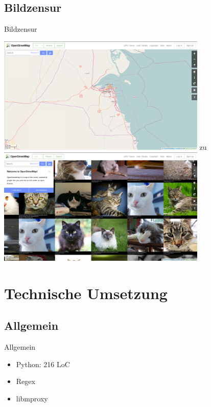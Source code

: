 \documentclass [xcolor=dvipsnames] {beamer}
\begin{document}
\subsection{Bildzensur}
\begin{frame}
	{\sc Bildzensur}
	\begin{center}
		{
			\includegraphics[width=10cm]{osm-1}
		}
		\only<2>
		{
			{\Large zu}
		}
		\only<3>
		{
			\includegraphics[width=10cm]{osm-mod-1}
		}
	\end{center}
\end{frame}

\section{Technische Umsetzung}
\subsection{Allgemein}
\begin{frame}
	{\sc Allgemein}
	\begin{itemize}
		\item Python: 216 LoC
		\item Regex
		\item libmproxy
	\end{itemize}
\end{frame}
\end{document}
